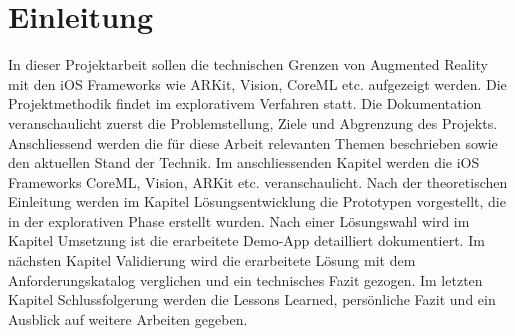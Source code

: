 \section{Einleitung}

In dieser Projektarbeit sollen die technischen Grenzen von Augmented Reality mit den iOS Frameworks wie ARKit, Vision, CoreML etc. aufgezeigt werden. Die Projektmethodik findet im explorativem Verfahren statt. 
Die Dokumentation veranschaulicht zuerst die Problemstellung, Ziele und Abgrenzung des Projekts. Anschliessend werden die für diese Arbeit relevanten Themen beschrieben sowie den aktuellen Stand der Technik. Im anschliessenden Kapitel werden die iOS Frameworks CoreML, Vision, ARKit etc. veranschaulicht. Nach der theoretischen Einleitung werden im Kapitel Lösungsentwicklung die Prototypen vorgestellt, die in der explorativen Phase erstellt wurden. Nach einer Lösungswahl wird im Kapitel Umsetzung ist die erarbeitete Demo-App detailliert dokumentiert. Im nächsten Kapitel Validierung wird die erarbeitete Lösung mit dem Anforderungskatalog verglichen und ein technisches Fazit gezogen. Im letzten Kapitel Schlussfolgerung werden die Lessons Learned, persönliche Fazit und ein Ausblick auf weitere Arbeiten gegeben.
